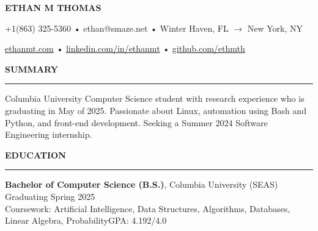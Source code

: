 \documentclass[10pt,letterpaper]{article}
\begin{document}
\begingroup
\centerline{\MakeUppercase{\LARGE\bf Ethan M Thomas}} \medskip
\endgroup

\begingroup
\centerline{+1(863) 325-5360 • ethan@smaze.net • Winter Haven, FL $\rightarrow$ New York, NY}
\endgroup
\par

\begingroup
\centerline{\href{www.ethanmt.com}{ethanmt.com} • \href{https://www.linkedin.com/in/ethanmt/}{linkedin.com/in/ethanmt} • \href{https://github.com/ethmth}{github.com/ethmth}}
\endgroup
\par


\medskip
\MakeUppercase{{\bf Summary}} %
\medskip
\hrule %
\begin{list}{}{\setlength{\leftmargin}{0em}}
    \item
          {Columbia University Computer Science student with research experience who is graduating in May of 2025. Passionate about Linux, automation using Bash and Python, and front-end development.
          Seeking a Summer 2024 Software Engineering internship.}
\end{list}



\medskip
\MakeUppercase{{\bf Education}}
\medskip
\hrule
\begin{list}{}{\setlength{\leftmargin}{0em}}
    \item
          {\bf Bachelor of Computer Science (B.S.)}, Columbia University (SEAS) \hfill  {Graduating Spring 2025}\\
          Coursework: Artificial Intelligence, Data Structures, Algorithms, Databases, Linear Algebra, Probability\hfill {GPA: 4.192/4.0}
\end{list}
\end{document}

